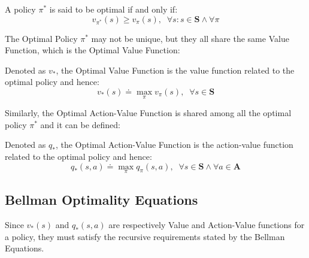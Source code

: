             \begin{definition}
                \label{def:opt}
                A policy $\pi^*$ is said to be optimal if and only if:
                \[ v_{\pi^*}(s) \geq v_{\pi}(s),\;\;\forall s: s \in \mathbf{S} \land \forall \pi\]
            \end{definition}
            \noindent
            The Optimal Policy $\pi^{*}$ may not be unique, but they all share the same Value Function, which is the Optimal Value Function:
            
            \begin{definition}
                \label{def:optvalue}
                Denoted as $v_{*}$, the Optimal Value Function is the value function related to the optimal policy and hence:
                \[ v_{*}(s) \doteq \max_{\pi} v_{\pi}(s),\;\;\forall s \in \mathbf{S}\]
            \end{definition}
            \noindent
            Similarly, the Optimal Action-Value Function is shared among all the optimal policy $\pi^{*}$ and it can be defined:
            
            \begin{definition}
                \label{def:optactionvalue}
                Denoted as $q_{*}$, the Optimal Action-Value Function is the action-value function related to the optimal policy and hence:
                \[ q_{*}(s, a) \doteq \max_{\pi} q_{\pi}(s, a),\;\;\forall s \in \mathbf{S} \land \forall a \in \mathbf{A}\]
            \end{definition}
            
        \subsection{Bellman Optimality Equations}
            \label{subs:optbellman}
            Since $v_{*}(s)$ and $q_{*}(s,a)$ are respectively Value and Action-Value functions for a policy, they must satisfy the recursive requirements stated by the Bellman Equations.
            
